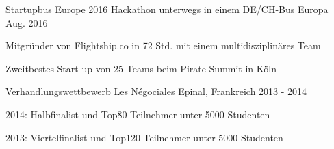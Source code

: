 

\begin{cventries}

  \cventry
    {Startupbus Europe 2016} %
    {Hackathon unterwegs in einem DE/CH-Bus} %
    {Europa} %
    {Aug. 2016} %
    {
      \begin{cvitems} %
        \item {Mitgründer von Flightship.co in 72 Std. mit einem multidisziplinäres Team}
        \item {Zweitbestes Start-up von 25 Teams beim Pirate Summit in Köln}
      \end{cvitems}
    }

  \cventry
    {Verhandlungswettbewerb} %
    {Les Négociales} %
    {Epinal, Frankreich} %
    {2013 - 2014} %
    {
    	\begin{cvitems}
    	\item{2014: Halbfinalist und Top80-Teilnehmer unter 5000 Studenten}
    	\item{2013: Viertelfinalist und Top120-Teilnehmer unter 5000 Studenten}
    	\end{cvitems}
    }
\end{cventries}

